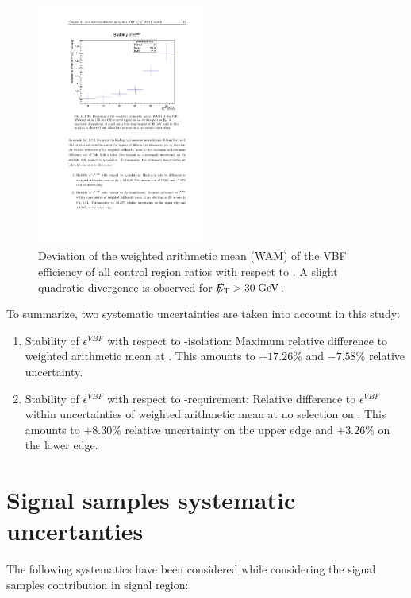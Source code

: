 \begin{figure}[!h]
	\centering
	\includegraphics[width=0.5\textwidth]{analysis/pics/vbeff_vs_met.pdf}
	\caption{Deviation of the weighted arithmetic mean (WAM) of the VBF efficiency of all control region ratios with respect to \met. A slight quadratic divergence is observed for $\slash\mkern-12mu{E}_{\text{T}} > 30\;\text{Ge}\kern-0.06667em\text{V}$.}
	\label{dihad:fig:vbeff_vs_met}
\end{figure}
 
To summarize, two systematic uncertainties are taken into account in this study:

\begin{enumerate}
	\item Stability of $\epsilon^{VBF}$ with respect to \hadtau-isolation: Maximum relative difference to weighted arithmetic mean at \gev. This amounts to $+17.26\%$ and  $-7.58\%$ relative uncertainty.
	\item Stability of $\epsilon^{VBF}$ with respect to \met-requirement: Relative difference to $\epsilon^{VBF}$ within uncertainties of weighted arithmetic mean at no selection on \met. This amounts to $+8.30\%$ relative uncertainty on the upper edge and $+3.26\%$ on the lower edge.
\end{enumerate}


\clearpage

\section{Signal samples systematic uncertanties}
\label{sec:systematics}

The following systematics have been considered while considering the signal samples contribution in signal region:

